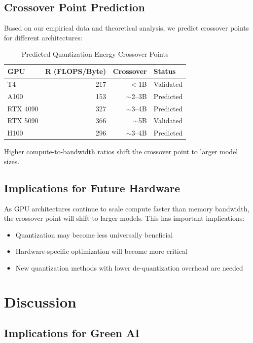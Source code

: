 \documentclass[11pt]{article}
\begin{document}
\subsection{Crossover Point Prediction}

Based on our empirical data and theoretical analysis, we predict crossover points for different architectures:

\begin{table}[h]
\centering
\caption{Predicted Quantization Energy Crossover Points}
\label{tab:crossover}
\begin{tabular}{lrrl}
\toprule
\textbf{GPU} & \textbf{R (FLOPS/Byte)} & \textbf{Crossover} & \textbf{Status} \\
\midrule
T4 & 217 & $<$1B & Validated \\
A100 & 153 & $\sim$2--3B & Predicted \\
RTX 4090 & 327 & $\sim$3--4B & Predicted \\
RTX 5090 & 366 & $\sim$5B & Validated \\
H100 & 296 & $\sim$3--4B & Predicted \\
\bottomrule
\end{tabular}
\end{table}

Higher compute-to-bandwidth ratios shift the crossover point to larger model sizes.

\subsection{Implications for Future Hardware}

As GPU architectures continue to scale compute faster than memory bandwidth, the crossover point will shift to larger models. This has important implications:
\begin{itemize}
    \item Quantization may become less universally beneficial
    \item Hardware-specific optimization will become more critical
    \item New quantization methods with lower de-quantization overhead are needed
\end{itemize}

\section{Discussion}
\label{sec:discussion}

\subsection{Implications for Green AI}
\end{document}
